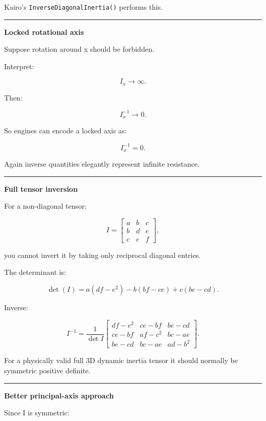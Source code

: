 Kairo's \texttt{InverseDiagonalInertia()} performs this.

\begin{center}\rule{0.5\linewidth}{0.5pt}\end{center}

\textbf{Locked rotational axis}

Suppose rotation around x should be forbidden.

Interpret:

\[
I_x\rightarrow\infty.
\]

Then:

\[
I_x^{-1}\rightarrow0.
\]

So engines can encode a locked axis as:

\[
I_x^{-1}=0.
\]

Again inverse quantities elegantly represent infinite resistance.

\begin{center}\rule{0.5\linewidth}{0.5pt}\end{center}

\textbf{Full tensor inversion}

For a non-diagonal tensor:

\[
I=
\begin{bmatrix}
a&b&c\\
b&d&e\\
c&e&f
\end{bmatrix},
\]

you cannot invert it by taking only reciprocal diagonal entries.

The determinant is:

\[
\det(I)
=
a(df-e^2)
-
b(bf-ce)
+
c(be-cd).
\]

Inverse:

\[
I^{-1}
=
\frac1{\det I}
\begin{bmatrix}
df-e^2 & ce-bf & be-cd\\
ce-bf & af-c^2 & bc-ae\\
be-cd & bc-ae & ad-b^2
\end{bmatrix}.
\]

For a physically valid full 3D dynamic inertia tensor it should normally be symmetric positive definite.

\begin{center}\rule{0.5\linewidth}{0.5pt}\end{center}

\textbf{Better principal-axis approach}

Since I is symmetric:

